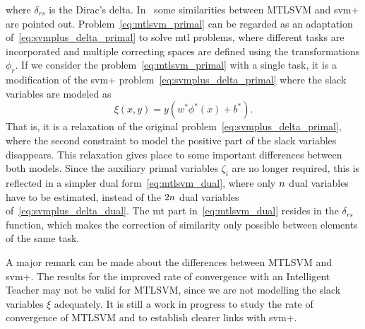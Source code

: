 where $\delta_{rs}$ is the Dirac's delta.
In~\cite{LiangC08} some similarities between MTLSVM and \acrshort{svm}+ are pointed out. Problem~\eqref{eq:mtlsvm_primal} can be regarded as an adaptation of~\eqref{eq:svmplus_delta_primal} to solve \acrshort{mtl} problems, where different tasks are incorporated and multiple correcting spaces are defined using the transformations $\phi_r$.
If we consider the problem~\eqref{eq:mtlsvm_primal} with a single task, it is a modification of the \acrshort{svm}+ problem~\eqref{eq:svmplus_delta_primal} where the slack variables are modeled as
$$ \xi(x, y) = y (w^* \phi^*(x) + b^*)  .$$
That is, it is a relaxation of the original problem~\eqref{eq:svmplus_delta_primal}, where the second constraint to model the positive part of the slack variables disappears.
This relaxation gives place to some important differences between both models. Since the auxiliary primal variables $\zeta_i$ are no longer required, this is reflected in a simpler dual form~\eqref{eq:mtlsvm_dual}, where only $n$ dual variables have to be estimated, instead of the $2n$ dual variables of~\eqref{eq:svmplus_delta_dual}.
The \acrshort{mt} part in~\eqref{eq:mtlsvm_dual} resides in the $\delta_{rs}$ function, which makes the correction of similarity only possible between elements of the same task.
%

A major remark can be made about the differences between MTLSVM and \acrshort{svm}+. The results for the improved rate of convergence with an Intelligent Teacher may not be valid for MTLSVM, since we are not modelling the slack variables $\xi$ adequately. 
It is still a work in progress to study the rate of convergence of MTLSVM and to establish clearer links with \acrshort{svm}+.













































